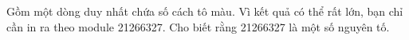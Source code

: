 Gồm một dòng duy nhất chứa số cách tô màu. Vì kết quả có thể rất lớn, bạn chỉ cần in ra theo module 21266327. Cho biết rằng 21266327 là một số nguyên tố.